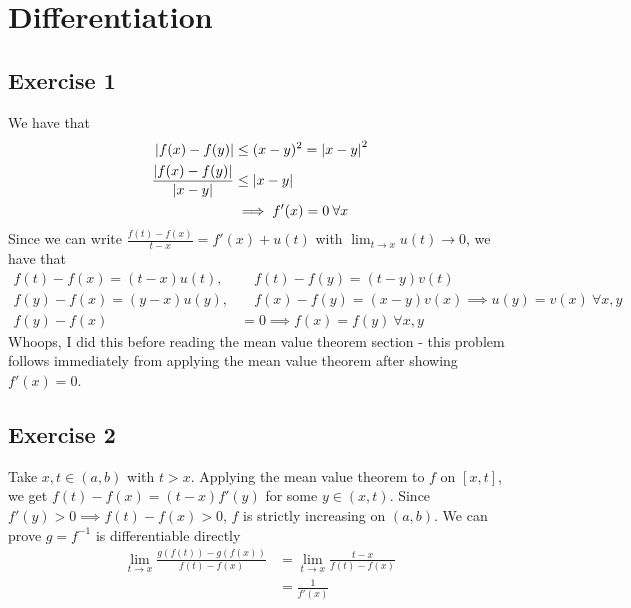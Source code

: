 \section{Differentiation}

\subsection{Exercise 1}
We have that
\begin{align*}
        \abs{f(x) - f(y)} &\leq (x - y)^2 = \abs{x - y}^2 \\
        \frac{\abs{f(x) - f(y)}}{\abs{x - y}} &\leq \abs{x - y} \\
                                              &\implies f'(x) = 0 \: \forall x
\end{align*}
Since we can write $\frac{f(t) - f(x)}{t - x} = f'(x) + u(t)$ with $\lim_{t \to x} u(t) \to 0$, we have that
\begin{align*}
        f(t) - f(x) = (t - x) u(t), &\quad f(t) - f(y) = (t - y) v(t) \\
        f(y) - f(x) = (y - x) u(y), &\quad f(x) - f(y) = (x - y) v(x) \implies u(y) = v(x) \: \forall x, y \\
        f(y) - f(x) &= 0 \implies f(x) = f(y) \: \forall x, y
\end{align*}
Whoops, I did this before reading the mean value theorem section - this problem follows immediately
from applying the mean value theorem after showing $f'(x) = 0$.

\subsection{Exercise 2}
Take $x, t \in (a, b)$ with $t > x$. Applying the mean value theorem to $f$ on $[x, t]$, we get
$f(t) - f(x) = (t - x) f'(y)$ for some $y \in (x, t)$. Since $f'(y) > 0 \implies f(t) - f(x) > 0$,
$f$ is strictly increasing on $(a, b)$. We can prove $g = f^{-1}$ is differentiable directly
\begin{align*}
        \lim_{t \to x} \frac{g(f(t)) - g(f(x))}{f(t) - f(x)} &= \lim_{t \to x} \frac{t - x}{f(t) - f(x)} \\
                                                             &= \frac{1}{f'(x)}
\end{align*}

